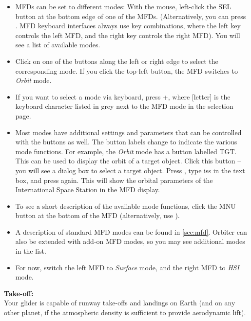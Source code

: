 \documentclass[Orbiter User Manual.tex]{subfiles}
\begin{document}
\begin{itemize}
\item MFDs can be set to different modes: With the mouse, left-click the SEL button at the bottom edge of one of the MFDs. (Alternatively, you can press \Shift{}. MFD keyboard interfaces always use \Shift key combinations, where the left \Shift key controls the left MFD, and the right \Shift key controls the right MFD). You will see a list of available modes.
\item Click on one of the buttons along the left or right edge to select the corresponding mode. If you click the top-left button, the MFD switches to \textit{Orbit} mode.
\item If you want to select a mode via keyboard, press \Shift{}+\Shift[letter], where [letter] is the keyboard character listed in grey next to the MFD mode in the selection page.
\item Most modes have additional settings and parameters that can be controlled with the buttons as well. The button labels change to indicate the various mode functions. For example, the \textit{Orbit} mode has a button labelled TGT. This can be used to display the orbit of a target object. Click this button – you will see a dialog box to select a target object. Press \Enter, type iss in the text box, and press \Enter again. This will show the orbital parameters of the International Space Station in the MFD display.
\item To see a short description of the available mode functions, click the MNU button at the bottom of the MFD (alternatively, use \Shift{}).
\item A description of standard MFD modes can be found in \ref{sec:mfd}. Orbiter can also be extended with add-on MFD modes, so you may see additional modes in the list.
\item For now, switch the left MFD to \textit{Surface} mode, and the right MFD to \textit{HSI} mode.
\end{itemize}

\noindent
\begin{figure}[H]
	\centering
\end{figure}

\noindent
\textbf{Take-off:}\\
Your glider is capable of runway take-offs and landings on Earth (and on any other planet, if the atmospheric density is sufficient to provide aerodynamic lift).
\end{document}
